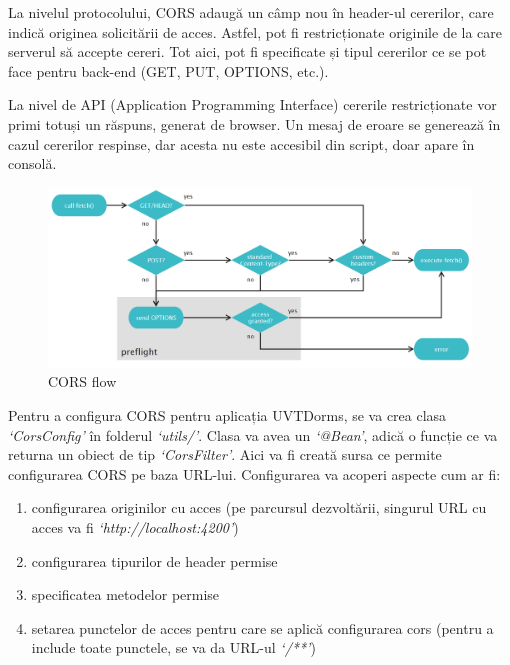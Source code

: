 \documentclass[12pt,a4paper]{report}
\theoremstyle{definition}
\theoremstyle{remark}
\begin{document}
\par La nivelul protocolului, CORS adaugă un câmp nou în header-ul cererilor, care indică originea solicitării de acces. Astfel, pot fi restricționate originile de la care serverul să accepte cereri. Tot aici, pot fi specificate și tipul cererilor ce se pot face pentru back-end (GET, PUT, OPTIONS, etc.).

\par La nivel de API (Application Programming Interface) cererile restricționate vor primi totuși un răspuns, generat de browser. Un mesaj de eroare se generează în cazul cererilor respinse, dar acesta nu este accesibil din script, doar apare în consolă.

\begin{figure}[H]
    \centering
    \includegraphics[width=1\linewidth]{resurse/diagrame/diagrama_cors.png}
    \caption{CORS flow\cite{gibbinscross}}
\end{figure}

\par Pentru a configura CORS pentru aplicația UVTDorms, se va crea clasa \textit{`CorsConfig'} în folderul \textit{`utils/'}. Clasa va avea un \textit{`@Bean'}, adică o funcție ce va returna un obiect de tip \textit{`CorsFilter'}. Aici va fi creată sursa ce permite configurarea CORS pe baza URL-lui. Configurarea va acoperi aspecte cum ar fi:

\begin{enumerate}
    \item configurarea originilor cu acces (pe parcursul dezvoltării, singurul URL cu acces va fi \textit{`http://localhost:4200'})
    \item configurarea tipurilor de header permise
    \item specificatea metodelor permise
    \item setarea punctelor de acces pentru care se aplică configurarea cors (pentru a include toate punctele, se va da URL-ul \textit{`/**'})
\end{enumerate}
\end{document}
